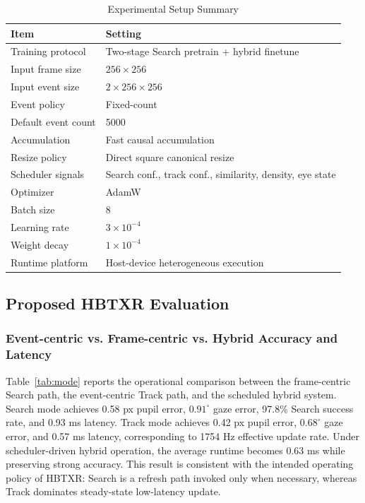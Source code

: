 \documentclass[journal]{IEEEtran}
\begin{document}
\begin{table}[t]
\caption{Experimental Setup Summary}
\label{tab:setup}
\centering
\footnotesize
\begin{tabular}{p{}p{}}
\toprule
Item & Setting \\
\midrule
Training protocol & Two-stage Search pretrain + hybrid finetune \\
Input frame size & $256\times256$ \\
Input event size & $2\times256\times256$ \\
Event policy & Fixed-count \\
Default event count & 5000 \\
Accumulation & Fast causal accumulation \\
Resize policy & Direct square canonical resize \\
Scheduler signals & Search conf., track conf., similarity, density, eye state \\
Optimizer & AdamW \\
Batch size & 8 \\
Learning rate & $3\times10^{-4}$ \\
Weight decay & $1\times10^{-4}$ \\
Runtime platform & Host-device heterogeneous execution \\
\bottomrule
\end{tabular}
\end{table}

\subsection{Proposed HBTXR Evaluation}
\subsubsection{Event-centric vs. Frame-centric vs. Hybrid Accuracy and Latency}
Table~\ref{tab:mode} reports the operational comparison between the frame-centric Search path, the event-centric Track path, and the scheduled hybrid system. Search mode achieves 0.58 px pupil error, $0.91^{\circ}$ gaze error, 97.8\% Search success rate, and 0.93 ms latency. Track mode achieves 0.42 px pupil error, $0.68^{\circ}$ gaze error, and 0.57 ms latency, corresponding to 1754 Hz effective update rate. Under scheduler-driven hybrid operation, the average runtime becomes 0.63 ms while preserving strong accuracy. This result is consistent with the intended operating policy of HBTXR: Search is a refresh path invoked only when necessary, whereas Track dominates steady-state low-latency update.
\end{document}
